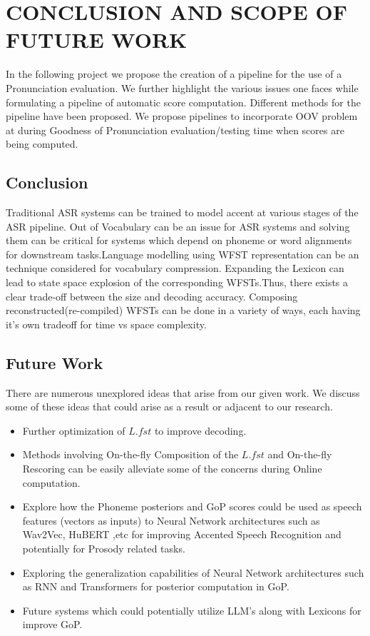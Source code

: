 \documentclass[letterpaper,12pt]{article}
\begin{document}
\pagebreak


\section{CONCLUSION AND SCOPE OF FUTURE WORK}

In the following project we propose the creation of a pipeline for the use of a Pronunciation evaluation. We further 
highlight the various issues one faces while formulating a pipeline of automatic score 
computation. Different methods for the pipeline have been proposed. We propose pipelines to incorporate OOV problem at  during Goodness of Pronunciation evaluation/testing time when scores are being computed.

\subsection{Conclusion}
Traditional ASR systems can be trained to model accent at various stages of the ASR 
pipeline. Out of Vocabulary can be an issue for ASR systems and solving them can be critical for systems which depend on phoneme or word alignments for downstream tasks.Language modelling using WFST representation can be an technique considered for vocabulary compression. Expanding the Lexicon can lead to state space explosion of the corresponding WFSTs.Thus, there exists a clear trade-off between the size and decoding accuracy.  Composing reconstructed(re-compiled) WFSTs can be done in a variety of ways, each having it's own tradeoff for time vs space complexity.

\subsection{Future Work}
There are numerous unexplored ideas that arise from our given work. We discuss some of these ideas that could arise as a result or adjacent to our research.
\begin{itemize}
\item Further optimization of $L.fst$ to improve decoding.
\item Methods involving On-the-fly Composition of the $L.fst$ and On-the-fly Rescoring can be easily alleviate some of the concerns during Online computation.
\item Explore how the Phoneme posteriors and GoP scores could be used as speech features (vectors as inputs) to Neural Network architectures such as Wav2Vec, HuBERT ,etc for improving Accented Speech Recognition and potentially for Prosody related tasks.
\item Exploring the generalization capabilities of Neural Network architectures such as 
RNN and Transformers for posterior computation in GoP.
\item Future systems which could potentially utilize LLM's along with Lexicons for improve GoP.

\end{itemize}
\pagebreak
 
\end{document}
